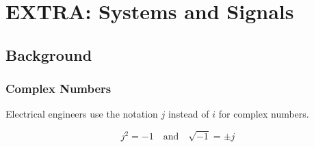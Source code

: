 \section{EXTRA: Systems and Signals}
\subsection{Background}
\subsubsection{Complex Numbers}
Electrical engineers use the notation $j$ instead of $i$ for complex numbers.

\begin{equation}
    j^2 = -1 \quad \text{and} \quad \sqrt{-1} = \pm j
\end{equation}